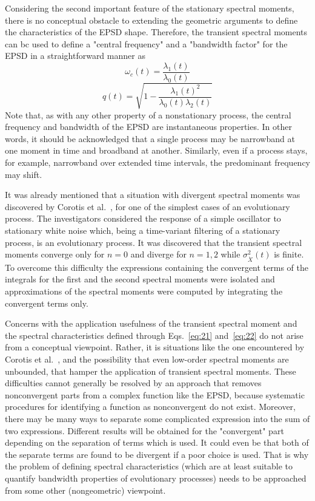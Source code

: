 \documentclass{article}
\begin{document}
Considering the second important feature of the stationary spectral moments,
there is no conceptual obstacle to extending the geometric arguments to define
the characteristics of the EPSD shape. Therefore, the transient spectral
moments can bc used to define a "central frequency" and a "bandwidth factor"
for the EPSD in a straightforward manner as
\begin{equation}
  \omega_c (t) = \frac{\lambda_1 (t)}{\lambda_0 (t)} \label{eq:21}
\end{equation}
\begin{equation}
  q (t) = \sqrt{1 - \frac{\lambda_1 (t)^2}{\lambda_0 (t) \lambda_2 (t)}}
  \label{eq:22}
\end{equation}
Note that, as with any other property of a nonstationary process, the central
frequency and bandwidth of the EPSD are instantaneous properties. In other
words, it should be acknowledged that a single process may be narrowband at
one moment in time and broadband at another. Similarly, even if a process
stays, for example, narrowband over extended time intervals, the predominant
frequency may shift.

It was already mentioned that a situation with divergent spectral moments was
discovered by Corotis et al.~{\cite{Corotis1972}}, for one of the simplest
cases of an evolutionary process. The investigators considered the response of
a simple oscillator to stationary white noise which, being a time-variant
filtering of a stationary process, is an evolutionary process. It was
discovered that the transient spectral moments converge only for $n = 0$ and
diverge for $n = 1, 2$ while $\sigma_{\dot{X}}^2 (t)$ is finite. To overcome
this difficulty the expressions containing the convergent terms of the
integrals for the first and the second spectral moments were isolated and
approximations of the spectral moments were computed by integrating the
convergent terms only.

Concerns with the application usefulness of the transient spectral moment and
the spectral characteristics defined through Eqs.~\eqref{eq:21}
and~\eqref{eq:22} do not arise from a conceptual viewpoint. Rather, it is
situations like the one encountered by Corotis et al.~{\cite{Corotis1972}},
and the possibility that even low-order spectral moments are unbounded, that
hamper the application of transient spectral moments. These difficulties
cannot generally be resolved by an approach that removes nonconvergent parts
from a complex function like the EPSD, because systematic procedures for
identifying a function as nonconvergent do not exist. Moreover, there may be
many ways to separate some complicated expression into the sum of two
expressions. Different results will be obtained for the "convergent" part
depending on the separation of terms which is used. It could even be that both
of the separate terms are found to be divergent if a poor choice is used. That
is why the problem of defining spectral characteristics (which are at least
suitable to quantify bandwidth properties of evolutionary processes) needs to
be approached from some other (nongeometric) viewpoint.
\end{document}
